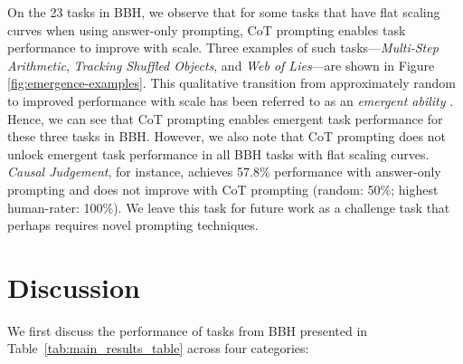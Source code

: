 On the 23 tasks in BBH, we observe that for some tasks that have flat scaling curves when using answer-only prompting, CoT prompting enables task performance to improve with scale. Three examples of such tasks---\emph{Multi-Step Arithmetic}, \emph{Tracking Shuffled Objects}, and \emph{Web of Lies}---are shown in Figure \ref{fig:emergence-examples}.
This qualitative transition from approximately random to improved performance with scale has been referred to as an \textit{emergent ability} \citep{wei2022emergent}. Hence, we can see that CoT prompting enables emergent task performance for these three tasks in BBH. However, we also note that CoT prompting does not unlock emergent task performance in all BBH tasks with flat scaling curves. 
\emph{Causal Judgement}, for instance, achieves 57.8\% performance with answer-only prompting and does not improve with CoT prompting (random: 50\%; highest human-rater: 100\%). 
We leave this task for future work as a challenge task that perhaps requires novel prompting techniques.

\section{Discussion}
\label{sec:discussion}
We first discuss the performance of tasks from BBH presented in Table~\ref{tab:main_results_table} across four categories:

